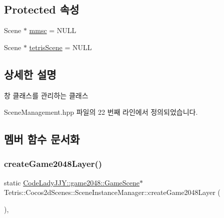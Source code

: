 \subsection*{Protected 속성}
\begin{DoxyCompactItemize}
\item 
Scene $\ast$ \hyperlink{class_tetris_1_1_cocos2d_scenes_1_1_scene_instance_manager_aed6486f09ebd0506636943d3355de167}{mmsc} = N\+U\+LL
\item 
Scene $\ast$ \hyperlink{class_tetris_1_1_cocos2d_scenes_1_1_scene_instance_manager_a7952a2c89cda55aba40056a7c9236ded}{tetris\+Scene} = N\+U\+LL
\end{DoxyCompactItemize}


\subsection{상세한 설명}
창 클래스를 관리하는 클래스 

Scene\+Management.\+hpp 파일의 22 번째 라인에서 정의되었습니다.



\subsection{멤버 함수 문서화}
\mbox{\label{class_tetris_1_1_cocos2d_scenes_1_1_scene_instance_manager_abf51bf93d8d00d660c18b9e690fdee1a}} 
\subsubsection{\texorpdfstring{create\+Game2048\+Layer()}{createGame2048Layer()}}
{\footnotesize\ttfamily static \hyperlink{class_code_lady_j_j_y_1_1game2048_1_1_game_scene}{Code\+Lady\+J\+J\+Y\+::game2048\+::\+Game\+Scene}$\ast$ Tetris\+::\+Cocos2d\+Scenes\+::\+Scene\+Instance\+Manager\+::create\+Game2048\+Layer (\begin{DoxyParamCaption}{ }\end{DoxyParamCaption})\hspace{0.3cm}{\ttfamily [inline]}, {\ttfamily [static]}}

